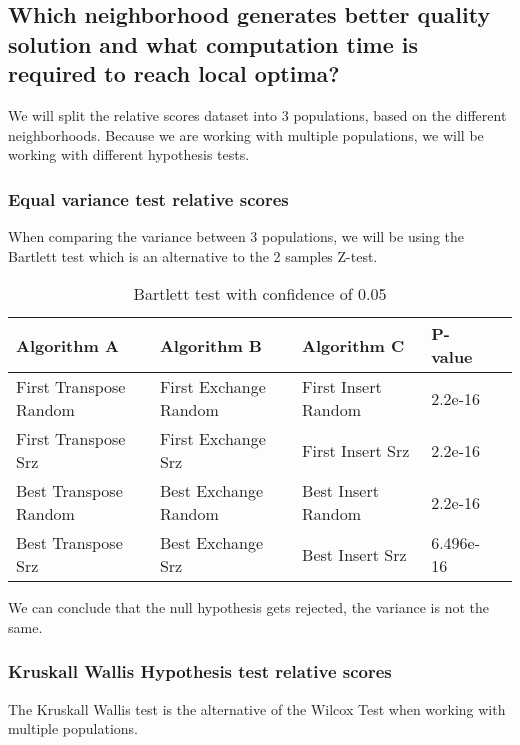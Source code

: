 \documentclass[]{article}
\begin{document}
	
	
	\subsection{Which neighborhood generates better quality solution and what computation time is required to reach local optima?}
	We will split the relative scores dataset into 3 populations, based on the different neighborhoods.
	Because we are working with multiple populations, we will be working with different hypothesis tests.\newline
	
	
	\subsubsection{Equal variance test relative scores}
	When comparing the variance between 3 populations, we will be using the Bartlett test which is an alternative to the 2 samples Z-test.
	\begin{table}[H]
		\centering
		\caption{Bartlett test with confidence of 0.05}
		\label{tab:table1}
		\begin{tabular}{lll{|}ll}
			\toprule
			Algorithm A & Algorithm B & Algorithm C & P-value\\
			\midrule
			First Transpose Random&First Exchange Random& First Insert Random&\color{OliveGreen}2.2e-16\\ 
			First Transpose Srz&First Exchange Srz& First Insert Srz&\color{OliveGreen}2.2e-16\\
			Best Transpose Random&Best Exchange Random& Best Insert Random&\color{OliveGreen}2.2e-16\\
			Best Transpose Srz&Best Exchange Srz& Best Insert Srz&\color{OliveGreen}6.496e-16\\
			
			\bottomrule
		\end{tabular}
	\end{table}
	
	We can conclude that the null hypothesis gets rejected, the variance is not the same.
	\subsubsection{Kruskall Wallis Hypothesis test relative scores}
	The Kruskall Wallis test is the alternative of the Wilcox Test when working with multiple populations.
	
\end{document}
